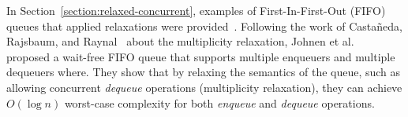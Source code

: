 In Section~\ref{section:relaxed-concurrent}, examples of First-In-First-Out (FIFO) queues that applied relaxations were provided~\cite{DBLP_conf_cf_HaasLHPSKS13, DBLP_conf_pact_KirschLP13, DBLP_conf_ica3pp_KirschPRS12}. Following the work of Castañeda, Rajsbaum, and Raynal~\cite{DBLP_conf_opodis_CastanedaRR20} about the multiplicity relaxation, Johnen et al.~\cite{DBLP_conf_opodis_JohnenKM22} proposed a wait-free FIFO queue that supports multiple enqueuers and multiple dequeuers where. They show that by relaxing the semantics of the queue, such as allowing concurrent \emph{dequeue} operations (multiplicity relaxation), they can achieve \(O(\log{n})\) worst-case complexity for both \emph{enqueue} and \emph{dequeue} operations.

